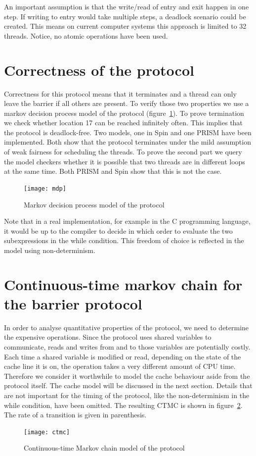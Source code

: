 \documentclass[a4paper, 10pt]{article}
\begin{document}
An important assumption is that the write/read of entry and exit happen in one step. If writing to entry would take multiple steps, a deadlock scenario could be created. This means on current computer systems this approach is limited to 32 threads. Notice, no atomic operations have been used.

\section{Correctness of the protocol}
\label{sec:correctness}
Correctness for this protocol means that it terminates and a thread can only leave the barrier if all others are present. To verify those two properties we use a markov decision process model of the protocol (figure~\ref{fig:mdp}). To prove termination we check whether location 17 can be reached infinitely often. This implies that the protocol is deadlock-free. Two models, one in Spin\cite{spin} and one PRISM\cite{prism} have been implemented. Both show that the protocol terminates under the mild assumption of weak fairness for scheduling the threads. To prove the second part we query the model checkers whether it is possible that two threads are in different loops at the same time. Both PRISM and Spin show that this is not the case.
\begin{figure}[htbp]
	\centering
	\texttt{[image: mdp]}
	\caption{Markov decision process model of the protocol}
	\label{fig:mdp}
\end{figure}

Note that in a real implementation, for example in the C programming language, it would be up to the compiler to decide in which order to evaluate the two subexpressions in the while condition. This freedom of choice is reflected in the model using non-determinism.

\clearpage

\section{Continuous-time markov chain for the barrier protocol}
In order to analyse quantitative properties of the protocol, we need to determine the expensive operations. Since the protocol uses shared variables to communicate, reads and writes from and to those variables are potentially costly. Each time a shared variable is modified or read, depending on the state of the cache line it is on, the operation takes a very different amount of CPU time. Therefore we consider it worthwhile to model the cache behaviour aside from the protocol itself. The cache model will be discussed in the next section. Details that are not important for the timing of the protocol, like the non-determinism in the while condition, have been omitted. The resulting CTMC is shown in figure~\ref{fig:ctmc}. The rate of a transition is given in parenthesis.
\begin{figure}[htbp]
	\centering
	\texttt{[image: ctmc]}
	\caption{Continuous-time Markov chain model of the protocol}
	\label{fig:ctmc}
\end{figure}
\clearpage
\end{document}
